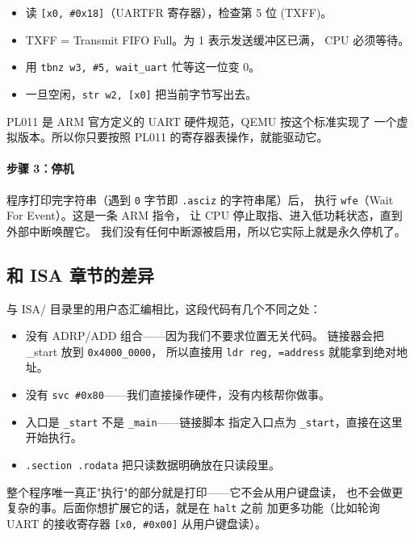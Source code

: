 \begin{itemize}
    \item 读 \texttt{[x0, \#0x18]}（UARTFR 寄存器），检查第 5 位 (TXFF)。
    \item TXFF = Transmit FIFO Full。为 1 表示发送缓冲区已满，
        CPU 必须等待。
    \item 用 \texttt{tbnz w3, \#5, wait\_uart} 忙等这一位变 0。
    \item 一旦空闲，\texttt{str w2, [x0]} 把当前字节写出去。
\end{itemize}

PL011 是 ARM 官方定义的 UART 硬件规范，QEMU 按这个标准实现了
一个虚拟版本。所以你只要按照 PL011 的寄存器表操作，就能驱动它。

\paragraph{步骤 3：停机}
程序打印完字符串（遇到 \texttt{0} 字节即 \texttt{.asciz} 的字符串尾）后，
执行 \texttt{wfe}（Wait For Event）。这是一条 ARM 指令，
让 CPU 停止取指、进入低功耗状态，直到外部中断唤醒它。
我们没有任何中断源被启用，所以它实际上就是永久停机了。

\subsection{和 ISA 章节的差异}

与 ISA/ 目录里的用户态汇编相比，这段代码有几个不同之处：

\begin{itemize}
    \item 没有 ADRP/ADD 组合——因为我们不要求位置无关代码。
        链接器会把 \_start 放到 \texttt{0x4000\_0000}，
        所以直接用 \texttt{ldr reg, =address} 就能拿到绝对地址。
    \item 没有 \texttt{svc \#0x80}——我们直接操作硬件，没有内核帮你做事。
    \item 入口是 \texttt{\_start} 不是 \texttt{\_main}——链接脚本
        指定入口点为 \texttt{\_start}，直接在这里开始执行。
    \item \texttt{.section .rodata} 把只读数据明确放在只读段里。
\end{itemize}

整个程序唯一真正"执行"的部分就是打印——它不会从用户键盘读，
也不会做更复杂的事。后面你想扩展它的话，就是在 \texttt{halt} 之前
加更多功能（比如轮询 UART 的接收寄存器 \texttt{[x0, \#0x00]} 从用户键盘读）。
